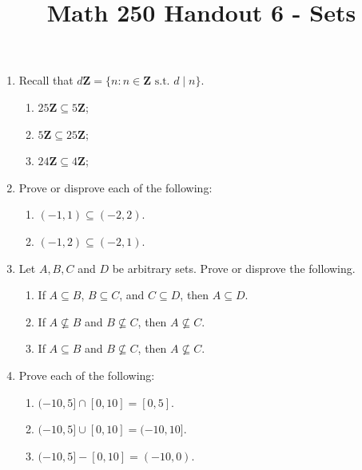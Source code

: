 \documentclass[12pt, reqno]{amsart}
\begin{document}
\title[Math 250 Handout 6 - Sets]{Math 250 Handout 6 - Sets}\maketitle

\begin{enumerate}
\item Recall that $d\mathbf{Z} = \{n : n \in \mathbf{Z} \text{ s.t. } d \mid n
 \}$.
 \begin{enumerate}
 \item $25\mathbf{Z} \subseteq 5 \mathbf{Z}$;
 \item $5\mathbf{Z} \subseteq 25\mathbf{Z}$;
 \item $24\mathbf{Z} \subseteq 4 \mathbf{Z}$; 

 \end{enumerate}
 \vspace{10pt}

\item Prove or disprove each of the following:
 \begin{enumerate}
 \item $(-1,1) \subseteq (-2,2)$. 
 \item $(-1,2) \subseteq (-2,1)$.
 \end{enumerate}
 \vspace{10pt} 

 
\item Let $A,B,C$ and $D$ be arbitrary sets. Prove or disprove the following.
 \begin{enumerate}
 \item If $A \subseteq B$, $B \subseteq C$, and $C \subseteq D$, then $A \subseteq D$.
 \item If $A \not \subseteq B$ and $B \not \subseteq C$, then $A \not \subseteq C$.
 \item If $A \subseteq B$ and $B \not \subseteq C$, then $A \not \subseteq C$.
 \end{enumerate}
\vspace{10pt}

\item Prove each of the following:
 \begin{enumerate}
 \item $(-10,5] \cap [0,10] = [0,5]$.
 \item $(-10,5] \cup [0,10] = (-10,10]$.
 \item $(-10,5] - [0,10] = (-10,0)$.
 \end{enumerate}


\end{enumerate}
\end{document}
